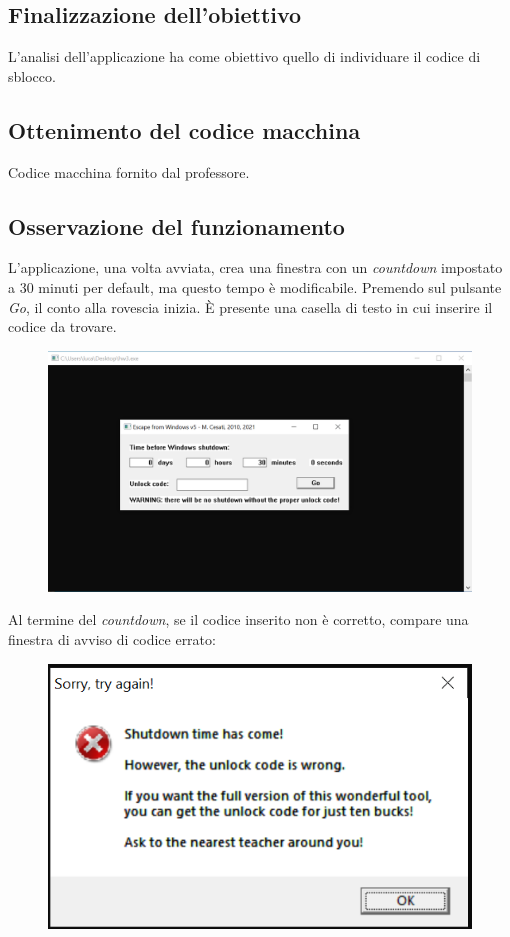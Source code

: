 \documentclass[a4paper, 12pt]{article}
\begin{document}
\subsection{Finalizzazione dell'obiettivo}
L'analisi dell'applicazione ha come obiettivo quello di individuare il codice di sblocco.

\subsection{Ottenimento del codice macchina}
Codice macchina fornito dal professore.

\subsection{Osservazione del funzionamento}
L'applicazione, una volta avviata, crea una finestra con un \textit{countdown} impostato a 30 minuti per default, ma questo tempo è modificabile. Premendo sul pulsante \textit{Go}, il conto alla rovescia inizia. È presente una casella di testo in cui inserire il codice da trovare. 
\begin{figure}[H]
\centering \includegraphics[scale=0.4]{program_launch}
\end{figure}
Al termine del \textit{countdown}, se il codice inserito non è corretto, compare una finestra di avviso di codice errato:
\begin{figure}[H]
\centering \includegraphics[scale=0.7]{error_message}
\end{figure}
\end{document}
